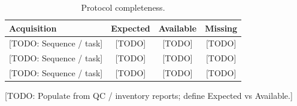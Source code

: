 \begin{table}[htbp]
\centering
\caption{Protocol completeness.}
\label{tab:protocol_completeness}
\begin{tabular}{@{}lccc@{}}
\toprule
\textbf{Acquisition} & \textbf{Expected} & \textbf{Available} & \textbf{Missing} \\
\midrule
{[TODO: Sequence / task]} & {[TODO]} & {[TODO]} & {[TODO]} \\
{[TODO: Sequence / task]} & {[TODO]} & {[TODO]} & {[TODO]} \\
{[TODO: Sequence / task]} & {[TODO]} & {[TODO]} & {[TODO]} \\
\bottomrule
\end{tabular}

{\footnotesize {[TODO: Populate from QC / inventory reports; define Expected vs Available.]}}
\end{table}

